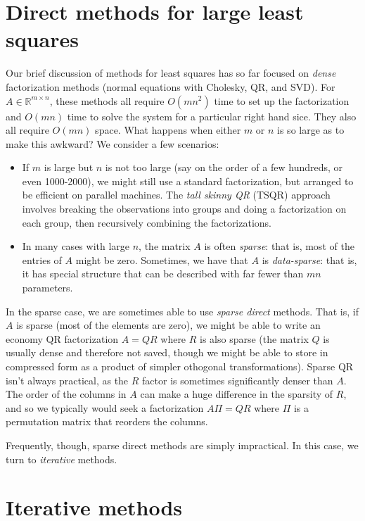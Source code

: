 \documentclass[12pt, leqno]{article} %
\begin{document}

\section{Direct methods for large least squares}

Our brief discussion of methods for least squares has so far focused
on {\em dense} factorization methods (normal equations with Cholesky,
QR, and SVD).  For $A \in \mathbb{R}^{m \times n}$, these methods all
require $O(mn^2)$ time to set up the factorization and $O(mn)$ time to
solve the system for a particular right hand sice.  They also all
require $O(mn)$ space.  What happens when either $m$ or $n$ is so
large as to make this awkward?  We consider a few scenarios:
\begin{itemize}
\item If $m$ is large but $n$ is not too large (say on the order of a
  few hundreds, or even 1000-2000), we might still use a standard
  factorization, but arranged to be efficient on parallel machines.
  The {\em tall skinny QR} (TSQR) approach involves breaking the
  observations into groups and doing a factorization on each group,
  then recursively combining the factorizations.
\item In many cases with large $n$, the matrix $A$ is often {\em
  sparse}: that is, most of the entries of $A$ might be zero.
  Sometimes, we have that $A$ is {\em data-sparse}: that is,
  it has special structure that can be described with far fewer than
  $mn$ parameters.
\end{itemize}

In the sparse case, we are sometimes able to use {\em sparse direct}
methods.  That is, if $A$ is sparse (most of the elements are zero),
we might be able to write an economy QR factorization $A = QR$ where
$R$ is also sparse (the matrix $Q$ is usually dense and therefore not
saved, though we might be able to store in compressed form as a
product of simpler othogonal transformations).  Sparse QR isn't always
practical, as the $R$ factor is sometimes significantly denser than
$A$.  The order of the columns in $A$ can make a huge difference in
the sparsity of $R$, and so we typically would seek a factorization
$A\Pi = QR$ where $\Pi$ is a permutation matrix that reorders the
columns.

Frequently, though, sparse direct methods are simply impractical.
In this case, we turn to {\em iterative} methods.

\section{Iterative methods}
\end{document}
